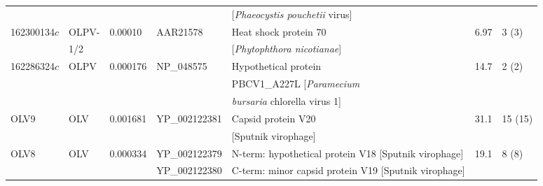 \begin{table}
\begin{tabularx}{\textwidth}{p{1.3cm}p{1.2cm}p{1cm}p{1.8cm}p{4.7cm}p{0.4cm}p{1.4cm}}
 &  &  &  & [\emph{Phaeocystis pouchetii} virus] &  &  \\
162300134$c$ & OLPV- & 0.00010 & AAR21578 & Heat shock protein 70 & 6.97 & 3 (3) \\
 & 1/2  &  &  & [\emph{Phytophthora nicotianae}] &  &  \\
162286324$c$ & OLPV & 0.000176 & NP\_048575 & Hypothetical protein & 14.7 & 2 (2) \\
 &  &  &  & PBCV1\_A227L [\emph{Paramecium} &  &  \\
 &  &  &  & \emph{bursaria} chlorella virus 1] &  &  \\
OLV9 & OLV & 0.001681 & YP\_002122381 & Capsid protein V20 & 31.1 & 15 (15) \\
 &  &  &  & [Sputnik virophage] &  &  \\
OLV8 & OLV & 0.000334 & YP\_002122379 & N-term: hypothetical protein V18 [Sputnik virophage]   & 19.1 & 8 (8) \\
 &  &  & YP\_002122380 &  C-term: minor capsid protein V19 [Sputnik virophage]  &  &  \\
\bottomrule
\end{tabularx}
\end{table}
\endgroup

